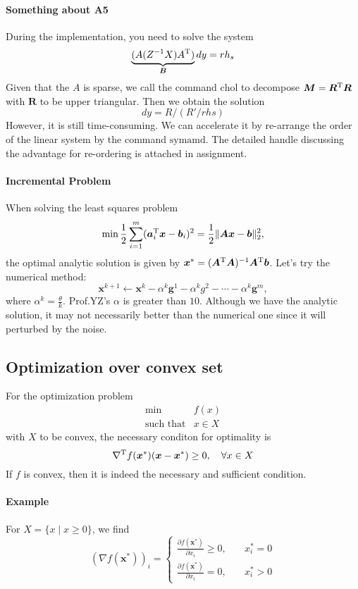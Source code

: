 \paragraph{Something about A5}
During the implementation, you need to solve the system
\[
\underbrace{(A(Z^{-1}X)A^{\mathrm T})}_{\bm B}dy=rh_s
\]
Given that the $A$ is sparse, we call the command $\textrm{chol}$ to decompose $\bm M=\bm R^{\mathrm T}\bm R$ with $\bm R$ to be upper triangular. Then we obtain the solution 
\[
dy=R/(R'/rhs)
\]
However, it is still time-consuming. We can accelerate it by re-arrange the order of the linear system by the command $\textrm{symamd}$. The detailed handle discussing the advantage for re-ordering is attached in assignment.
\paragraph{Incremental Problem}When solving the least squares problem
\[
\min\frac{1}{2}\sum_{i=1}^m(\bm a_i^{\mathrm T}\bm x-\bm b_i)^2=\frac{1}{2}\|\bm{Ax}-\bm b\|_2^2,
\]
the optimal analytic solution is given by $\bm x^*=(\bm A^{\mathrm T}\bm A)^{-1}\bm A^{\mathrm T}\bm b$. Let's try the numerical method:
\[
\bm x^{k+1}\leftarrow\bm x^k-\alpha^k\bm g^1-\alpha^kg^2-\cdots-\alpha^k\bm g^m,
\]
where $\alpha^k=\frac{\theta}{k}$. Prof.YZ's $\alpha$ is greater than $10$. Although we have the analytic solution, it may not necessarily better than the numerical one since it will perturbed by the noise.

\subsection{Optimization over convex set}
For the optimization problem
\begin{equation}
\begin{array}{ll}
\min&f(x)\\
\mbox{such that}&x\in X
\end{array}\label{Eq:7:1}
\end{equation}
with $X$ to be convex, the necessary conditon for optimality is
\[
\nabla^{\mathrm T} f(\bm x^*)(\bm x-\bm x^*)\ge0,\quad\forall x\in X
\]
If $f$ is convex, then it is indeed the necessary and sufficient condition.
\paragraph{Example}
For $X=\{x\mid x\ge0\}$, we find
\[
(\nabla f(\bm x^*))_i=\left\{
\begin{aligned}
\frac{\partial f(\bm x^*)}{\partial x_i}\ge0,&\quad x_i^*=0\\
\frac{\partial f(\bm x^*)}{\partial x_i}=0,&\quad x_i^*>0
\end{aligned}
\right.
\]
